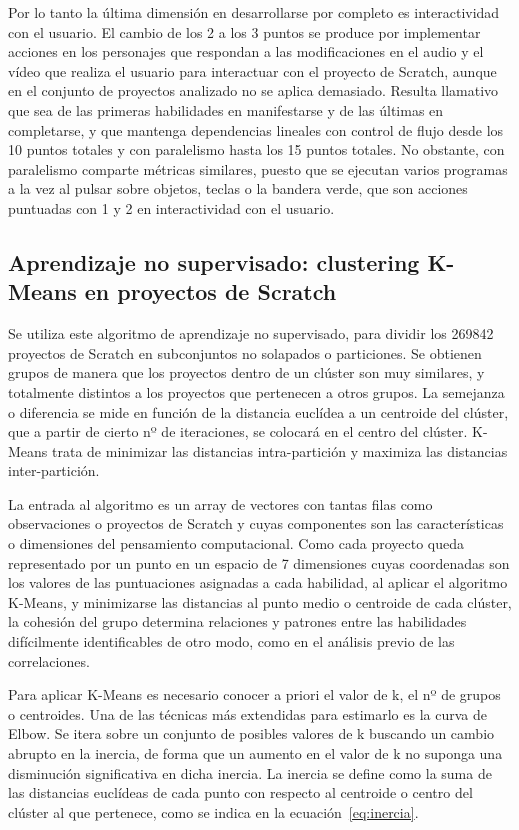 \documentclass[a4paper, 12pt]{book}
\begin{document}
Por lo tanto la última dimensión en desarrollarse por completo es interactividad con el usuario. El cambio de los 2 a los 3 puntos se produce por implementar acciones en los personajes que respondan a las modificaciones en el audio y el vídeo que realiza el usuario para interactuar con el proyecto de Scratch, aunque en el conjunto de proyectos analizado no se aplica demasiado. Resulta llamativo que sea de las primeras habilidades en manifestarse y de las últimas en completarse, y que mantenga dependencias lineales con control de flujo desde los 10 puntos totales %
y con paralelismo hasta los 15 puntos totales. No obstante, con paralelismo comparte métricas similares, puesto que se ejecutan varios programas a la vez al pulsar sobre objetos, teclas o la bandera verde, que son acciones puntuadas con 1 y 2 en interactividad con el usuario. 

\subsection{Aprendizaje no supervisado: clustering K-Means en proyectos de Scratch}
\label{subsec:kmeans_Scratch}

Se utiliza este algoritmo de aprendizaje no supervisado, para dividir los 269842 proyectos de Scratch en subconjuntos no solapados o particiones. Se obtienen grupos de manera que los proyectos dentro de un clúster son muy similares, y totalmente distintos a los proyectos que pertenecen a otros grupos. La semejanza o diferencia se mide en función de la distancia euclídea a un centroide del clúster, que a partir de cierto nº de iteraciones, se colocará en el centro del clúster. K-Means trata de minimizar las distancias intra-partición y maximiza las distancias inter-partición.

La entrada al algoritmo es un array de vectores con tantas filas como observaciones o proyectos de Scratch y cuyas componentes son las características o dimensiones del pensamiento computacional. Como cada proyecto queda representado por un punto en un espacio de 7 dimensiones cuyas coordenadas son los valores de las puntuaciones asignadas a cada habilidad, al aplicar el algoritmo K-Means, y minimizarse las distancias al punto medio o centroide de cada clúster, la cohesión del grupo determina relaciones y patrones entre las habilidades difícilmente identificables de otro modo, como en el análisis previo de las correlaciones. 

Para aplicar K-Means es necesario conocer a priori el valor de k, el nº de grupos o centroides. Una de las técnicas más extendidas para estimarlo es la curva de Elbow. Se itera sobre un conjunto de posibles valores de k buscando un cambio abrupto en la inercia, de forma que un aumento en el valor de k no suponga una disminución significativa en dicha inercia. La inercia se define como la suma de las distancias euclídeas de cada punto con respecto al centroide o centro del clúster al que pertenece, como se indica en la ecuación~\eqref{eq:inercia}.
\end{document}
